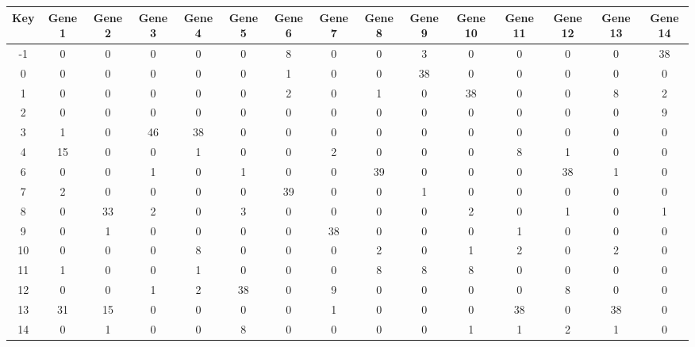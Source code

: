 \begin{tabular}{|c|c|c|c|c|c|c|c|c|c|c|c|c|c|c|}
\hline
Key & Gene 1 & Gene 2 & Gene 3 & Gene 4 & Gene 5 & Gene 6 & Gene 7 & Gene 8 & Gene 9 & Gene 10 & Gene 11 & Gene 12 & Gene 13 & Gene 14 \\
\hline
-1 & 0 & 0 & 0 & 0 & 0 & 8 & 0 & 0 & 3 & 0 & 0 & 0 & 0 & 38 \\
0 & 0 & 0 & 0 & 0 & 0 & 1 & 0 & 0 & 38 & 0 & 0 & 0 & 0 & 0 \\
1 & 0 & 0 & 0 & 0 & 0 & 2 & 0 & 1 & 0 & 38 & 0 & 0 & 8 & 2 \\
2 & 0 & 0 & 0 & 0 & 0 & 0 & 0 & 0 & 0 & 0 & 0 & 0 & 0 & 9 \\
3 & 1 & 0 & 46 & 38 & 0 & 0 & 0 & 0 & 0 & 0 & 0 & 0 & 0 & 0 \\
4 & 15 & 0 & 0 & 1 & 0 & 0 & 2 & 0 & 0 & 0 & 8 & 1 & 0 & 0 \\
6 & 0 & 0 & 1 & 0 & 1 & 0 & 0 & 39 & 0 & 0 & 0 & 38 & 1 & 0 \\
7 & 2 & 0 & 0 & 0 & 0 & 39 & 0 & 0 & 1 & 0 & 0 & 0 & 0 & 0 \\
8 & 0 & 33 & 2 & 0 & 3 & 0 & 0 & 0 & 0 & 2 & 0 & 1 & 0 & 1 \\
9 & 0 & 1 & 0 & 0 & 0 & 0 & 38 & 0 & 0 & 0 & 1 & 0 & 0 & 0 \\
10 & 0 & 0 & 0 & 8 & 0 & 0 & 0 & 2 & 0 & 1 & 2 & 0 & 2 & 0 \\
11 & 1 & 0 & 0 & 1 & 0 & 0 & 0 & 8 & 8 & 8 & 0 & 0 & 0 & 0 \\
12 & 0 & 0 & 1 & 2 & 38 & 0 & 9 & 0 & 0 & 0 & 0 & 8 & 0 & 0 \\
13 & 31 & 15 & 0 & 0 & 0 & 0 & 1 & 0 & 0 & 0 & 38 & 0 & 38 & 0 \\
14 & 0 & 1 & 0 & 0 & 8 & 0 & 0 & 0 & 0 & 1 & 1 & 2 & 1 & 0 \\
\hline
\end{tabular}